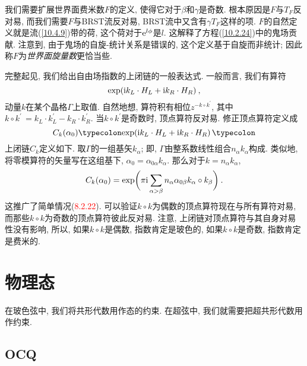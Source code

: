 我们需要扩展世界面费米数$ F $的定义, 使得它对于$ \beta $和$ \gamma $是奇数. 根本原因是$ F $与$ T_{F} $反对易, 而我们需要$ F $与BRST流反对易, BRST流中又含有$ \gamma T_{F} $这样的项. $F $的自然定义就是流(\ref{10.4.9})带的荷, 这个荷对于$ \mathrm{e}^{l\phi} $是$ l$. 这解释了方程(\ref{10.2.24})中的鬼场贡献. 注意到, 由于鬼场的自旋-统计关系是错误的, 这个定义基于自旋而非统计; 因此称$ F $为{\emph{世界面旋量数}}更恰当些.


完整起见, 我们给出自由场指数的上闭链的一般表达式. 一般而言, 我们有算符
\begin{equation}
    \exp(\mathrm{i} k_{L}\cdot H_{L} + \mathrm{i} k_{R}\cdot H_{R}) \:, \label{10.4.26}
\end{equation}
动量$ k $在某个晶格$ \Gamma $上取值. 自然地想, 算符积有相位$ z^{-k\circ k^{\prime}}$, 其中$ k\circ k^{\prime}\,=k_{L}\cdot k_{L}^{\prime} -k_{R}\cdot k_{R}^{\prime}$. 当$ k\circ k^{\prime} $是奇数时, 顶点算符反对易. 修正顶点算符定义成
\begin{equation}
    C_{k}(\alpha_{0}) \typecolon\!\exp(\mi k_{L}\cdot H_{L} + \mi k_{R}\cdot H_{R})\,\typecolon \label{10.4.27}
\end{equation}
上闭链$  C_{k} $定义如下. 取$ \Gamma $的一组基矢$ k_{\alpha}$; 即, $\Gamma $由整系数线性组合$ n_{\alpha}k_{\alpha} $构成. 类似地, 将零模算符的矢量写在这组基下, $\alpha_{0}=\alpha_{0\alpha}k_{\alpha}$. 那么对于$ k=n_{\alpha} k_{\alpha}$,
\begin{equation}
    C_{k}(\alpha_{0})=\exp \biggl( \pi\mathrm{i} \sum_{\alpha >\beta} 
    n_{\alpha}\alpha_{0\beta}k_{\alpha}\circ k_{\beta}\biggr) \:. \label{10.4.28} 
\end{equation}
这推广了简单情况(\textcolor{red}{8.2.22}). 可以验证$ k\circ k $为偶数的顶点算符现在与所有算符对易, 而那些$ k\circ k $为奇数的顶点算符彼此反对易. 注意, 上闭链对顶点算符与其自身对易性没有影响, 所以, 如果$ k\circ k $是偶数, 指数肯定是玻色的, 如果$ k\circ k $是奇数, 指数肯定是费米的.

\section{物理态}

在玻色弦中, 我们将共形代数用作态的约束. 在超弦中, 我们就需要把超共形代数用作约束.

\subsection*{OCQ}

